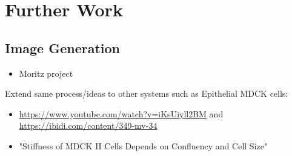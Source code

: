 \section{Further Work}
\subsection{Image Generation}
\begin{itemize}
    \item Moritz project
\end{itemize}

Extend same process/ideas to other systems such as Epithelial MDCK cells:
\begin{itemize}
    \item \url{https://www.youtube.com/watch?v=iKsUiyll2BM} and
        \url{https://ibidi.com/content/349-mv-34}
    \item "Stiffness of MDCK II Cells Depends on Confluency and Cell Size" \cite{Nehls2019}
\end{itemize}



